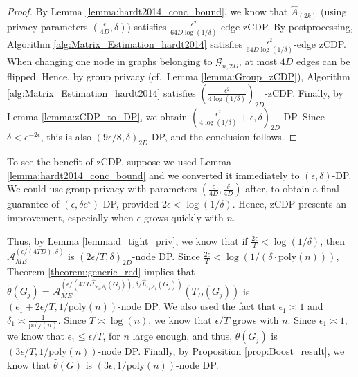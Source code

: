 \documentclass{article}
\newcommand{\thetahat}{\ensuremath{\widehat{\theta}}}
\begin{document}
\begin{proof}
By Lemma \ref{lemma:hardt2014_conc_bound}, we know that $\hat{A}_{(2k)}$ (using privacy parameters $\left(\frac{\epsilon}{4D}, \delta\right)$) satisfies $\frac{\epsilon^2}{64D\log(1/\delta)}$-edge zCDP. By postprocessing, Algorithm \ref{alg:Matrix_Estimation_hardt2014} satisfies $\frac{\epsilon^2}{64D\log(1/\delta)}$-edge zCDP. When changing one node in graphs belonging to $\mathcal{G}_{n, 2D}$, at most $4D$ edges can be flipped. Hence, by group privacy (cf.\ Lemma \ref{lemma:Group_zCDP}), Algorithm \ref{alg:Matrix_Estimation_hardt2014} satisfies $\left(\frac{\epsilon^2}{4\log(1/\delta)}\right)_{2D}$-zCDP. Finally, by Lemma \ref{lemma:zCDP_to_DP}, we obtain $\left(\frac{\epsilon^2}{4\log(1/\delta)} + \epsilon, \delta\right)_{2D}$-DP. Since $\delta < e^{-2\epsilon}$, this is also $(9\epsilon/8, \delta)_{2D}$-DP, and the conclusion follows.
\end{proof}

To see the benefit of zCDP, suppose we used Lemma \ref{lemma:hardt2014_conc_bound} and we converted it immediately to $(\epsilon, \delta)$-DP. We could use group privacy with parameters $\left(\frac{\epsilon}{4D}, \frac{\delta}{4D}\right)$ after, to obtain a final guarantee of $(\epsilon, \delta e^{\epsilon})$-DP, provided $2\epsilon < \log(1/\delta)$. Hence, zCDP presents an improvement, especially when $\epsilon$ grows quickly with $n$.

Thus, by Lemma \ref{lemma:d_tight_priv}, we know that if $\frac{2\epsilon}{T} < \log(1/\delta)$, then $\mathcal{A}_{ME}^{(\epsilon/(4TD), \delta)}$ is $(2\epsilon/T, \delta)_{2D}$-node DP. Since $\frac{2\epsilon}{T} < \log(1/(\delta\cdot\mathrm{poly}(n)))$, Theorem \ref{theorem:generic_red} implies that $\widetilde{\theta}(G_j) = \mathcal{A}_{ME}^{\left(\epsilon/(4TD\hat{L}_{\epsilon_1, \delta_1}(G_j)), \delta/\hat{L}_{\epsilon_1, \delta_1}(G_j)\right)}(T_{D}(G_j))$ is $(\epsilon_1 + 2\epsilon/T, 1/\mathrm{poly}(n))$-node DP. We also used the fact that $\epsilon_1 \asymp 1$ and $\delta_1 \asymp \frac{1}{\mathrm{poly}(n)}$. Since $T \asymp \log(n)$, we know that $\epsilon/T$ grows with $n$. Since $\epsilon_1 \asymp 1$, we know that $\epsilon_1 \leq \epsilon/T$, for $n$ large enough, and thus, $\widetilde{\theta}(G_j)$ is $(3\epsilon/T, 1/\mathrm{poly}(n))$-node DP. Finally, by Proposition \ref{prop:Boost_result}, we know that $\thetahat(G)$ is $(3\epsilon, 1/\mathrm{poly}(n))$-node DP.
\end{document}
